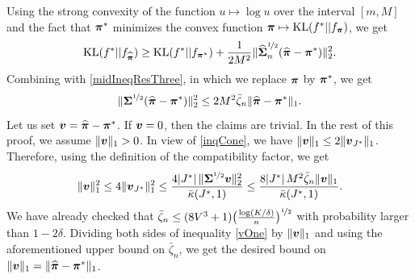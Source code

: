 Using the strong convexity of the function $u\mapsto \log u$ over the interval $[m,M]$ and
the fact that $\boldsymbol \pi^*$ minimizes the convex function $\boldsymbol \pi\mapsto{\rm KL}(f^*||f_{\boldsymbol \pi})$, we get
\begin{equation}
{\rm KL}(f^*||f_{\widehat{\boldsymbol \pi}}) \ge {\rm KL}(f^*||f_{\boldsymbol \pi^*})+\frac1{2M^2} \|\widehat{\boldsymbol\Sigma}_n^{\nicefrac12}(\widehat{\boldsymbol \pi}-
\boldsymbol \pi^*)\|_2^2.
\end{equation}
Combining with \eqref{midIneqResThree}, in which we replace $\boldsymbol \pi$ by $\boldsymbol \pi^*$, we get
\begin{equation}\label{midIneqResFr}
\|\boldsymbol\Sigma^{\nicefrac12}(\widehat{\boldsymbol \pi}-\boldsymbol \pi^*)\|_2^2 \le 2 M^2\bar\zeta_n\|\widehat{\boldsymbol \pi}-\boldsymbol \pi^*\|_1.
\end{equation}
Let us set $\boldsymbol v = \widehat{\boldsymbol \pi}-\boldsymbol \pi^*$. If $\boldsymbol v=0$, then the claims are trivial. In the rest of this
proof, we assume $\|\boldsymbol v\|_1>0$. In view of \eqref{inqCone}, we have
$\|\boldsymbol v\|_1\le 2\|\boldsymbol v_{J^*}\|_1$. Therefore, using the definition of the compatibility
factor, we get
\begin{equation}\label{vOne}
\|\boldsymbol v\|_1^2\le 4\|\boldsymbol v_{J^*}\|_1^2\le \frac{4|J^*|\,\|\boldsymbol\Sigma^{\nicefrac12}\boldsymbol v\|_2^2}
{\bar\kappa(J^*,1)} \le \frac{8|J^*|\,M^2\bar\zeta_n\|\boldsymbol v\|_1}{\bar\kappa(J^*,1)}.
\end{equation}
We have already checked that $\bar\zeta_n \le (8V^3+1)\big(\frac{\log(K/\delta)}{n}
\big)^{\nicefrac12}$ with probability larger than $1-2\delta$. Dividing both sides of inequality
\eqref{vOne} by $\|\boldsymbol v\|_1$ and using the aforementioned upper bound on $\bar\zeta_n$,
we get the desired bound on $\|\boldsymbol v\|_1=\|\widehat{\boldsymbol \pi}-\boldsymbol \pi^*\|_1$.


